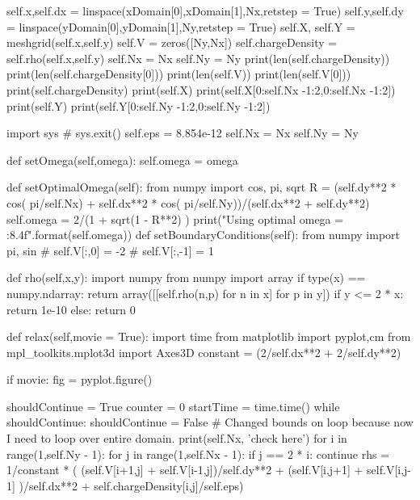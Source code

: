 \begin{enumerate}
\begin{codeexample}
\begin{VerbatimOut}{\listingFile}
        self.x,self.dx = linspace(xDomain[0],xDomain[1],Nx,retstep = True)
        self.y,self.dy = linspace(yDomain[0],yDomain[1],Ny,retstep = True)
        self.X, self.Y = meshgrid(self.x,self.y)
        self.V = zeros([Ny,Nx])
        self.chargeDensity = self.rho(self.x,self.y)
        self.Nx = Nx
        self.Ny = Ny
        print(len(self.chargeDensity))
        print(len(self.chargeDensity[0]))
        print(len(self.V))
        print(len(self.V[0]))
        print(self.chargeDensity)
        print(self.X)
        print(self.X[0:self.Nx -1:2,0:self.Nx -1:2])
        print(self.Y)
        print(self.Y[0:self.Ny -1:2,0:self.Ny -1:2])

        import sys
        #        sys.exit()
        self.eps = 8.854e-12
        self.Nx = Nx
        self.Ny = Ny

    def setOmega(self,omega):
        self.omega = omega

    def setOptimalOmega(self):
        from numpy import cos, pi, sqrt
        R = (self.dy**2 * cos( pi/self.Nx) + self.dx**2 * cos( pi/self.Ny))/(self.dx**2 + self.dy**2)
        self.omega = 2/(1 + sqrt(1 - R**2) )
        print("Using optimal omega = {:8.4f}".format(self.omega))
    def setBoundaryConditions(self):
        from numpy import pi, sin
        # self.V[:,0] = -2
        # self.V[:,-1] = 1

    def rho(self,x,y):
        import numpy
        from numpy import array
        if type(x) == numpy.ndarray:
            return array([[self.rho(n,p) for n in x] for p in y])
        if y <= 2 * x:
            return 1e-10
        else:
            return 0

    def relax(self,movie = True):
        import time
        from matplotlib import pyplot,cm
        from mpl_toolkits.mplot3d import Axes3D
        constant = (2/self.dx**2 + 2/self.dy**2)


        if movie:
            fig = pyplot.figure()

        shouldContinue = True
        counter = 0
        startTime = time.time()
        while shouldContinue:
            shouldContinue = False
            # Changed bounds on loop because now I need to loop over entire domain.
            print(self.Nx, 'check here')
            for i in range(1,self.Ny - 1):
                for j in range(1,self.Nx - 1):
                    if j == 2 * i:
                        continue
                    rhs = 1/constant *  ( (self.V[i+1,j] + self.V[i-1,j])/self.dy**2 + (self.V[i,j+1] + self.V[i,j-1] )/self.dx**2 + self.chargeDensity[i,j]/self.eps)


\end{VerbatimOut}
\end{codeexample}
\end{enumerate}
